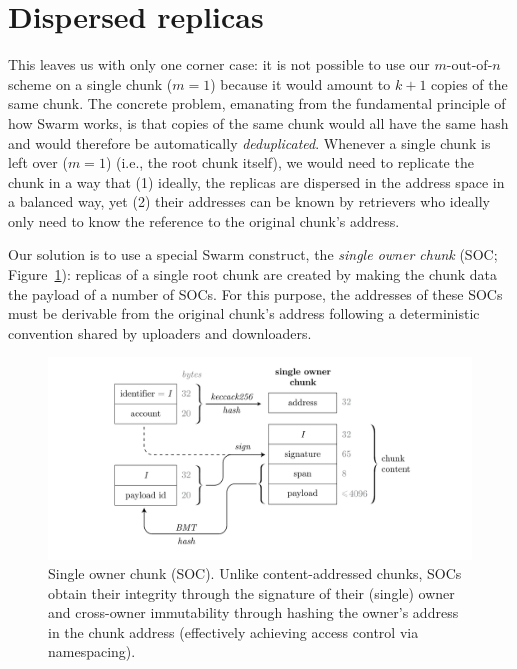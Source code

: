 \documentclass[manuscript,screen,review]{acmart}
\begin{document}
\section{Dispersed replicas}
\label{sec:dispersed-replicas}

This leaves us with only one corner case: it is not possible to use our $m\text{-out-of-}n$ scheme on a single chunk ($m=1$) because it would amount to $k+1$ copies of the same chunk. The concrete problem, emanating from the fundamental principle of how Swarm works, is that copies of the same chunk would all have the same hash and would therefore be automatically \emph{deduplicated}. Whenever a single chunk is left over ($m=1$) (i.e., the root chunk itself), we would need to replicate the chunk in a way that (1) ideally, the replicas are dispersed in the address space in a balanced way, yet (2) their addresses can be known by retrievers who ideally only need to know the reference to the original chunk's address.

 
Our solution is to use a special Swarm construct, the \emph{single owner chunk} (SOC; Figure~\ref{fig:soc}): replicas of a single root chunk are created by making the chunk data the payload of a number of SOCs. For this purpose, the addresses of these SOCs must be derivable from the original chunk's address following a deterministic convention shared by uploaders and downloaders.

\begin{figure}[!ht]
  \centering
  \includegraphics[width=\textwidth]{figs/single-owner-chunk.pdf}
  \Description[]{}\caption{Single owner chunk (SOC). Unlike content-addressed chunks, SOCs obtain their integrity through the signature of their (single) owner and cross-owner immutability through hashing the owner's address in the chunk address (effectively achieving access control via namespacing).}
   \label{fig:soc}
\Description[]{}
\end{figure}
\end{document}
